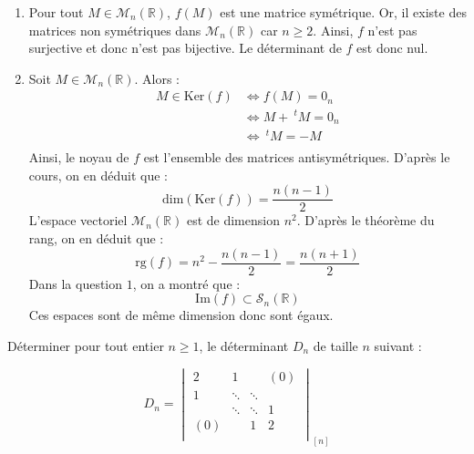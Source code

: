 \documentclass[a4paper,10pt]{report}
\begin{document}
\begin{enumerate}
\item Pour tout $M \in \mathcal{M}_n(\mathbb{R})$, $f(M)$ est une matrice symétrique. Or, il existe des matrices non symétriques dans $\mathcal{M}_n(\mathbb{R})$ car $n \geq 2$. Ainsi, $f$ n'est pas surjective et donc n'est pas bijective. Le déterminant de $f$ est donc nul.
\item Soit $M \in \mathcal{M}_n(\mathbb{R})$. Alors :
\begin{align*}
M \in \textrm{Ker}(f) & \Longleftrightarrow f(M)=0_n \\
& \Longleftrightarrow M+~^tM= 0_n \\
& \Longleftrightarrow ~^tM=-M \\
\end{align*}
Ainsi, le noyau de $f$ est l'ensemble des matrices antisymétriques. D'après le cours, on en déduit que :
$$ \textrm{dim}(\textrm{Ker}(f)) = \dfrac{n(n-1)}{2}$$
L'espace vectoriel $\mathcal{M}_n(\mathbb{R})$ est de dimension $n^2$. D'après le théorème du rang, on en déduit que :
$$ \textrm{rg}(f) = n^2 - \dfrac{n(n-1)}{2} = \dfrac{n(n+1)}{2}$$
Dans la question $1$, on a montré que :
$$ \textrm{Im}(f) \subset \mathcal{S}_n(\mathbb{R})$$
Ces espaces sont de même dimension donc sont égaux.
\end{enumerate}

\begin{Exa} Déterminer pour tout entier $n \geq 1$, le déterminant $D_n$ de taille $n$ suivant :

\[
    D_n =
    \begin{vmatrix}
        2 & 1 & {} & {(0)} \\
        1 & \ddots & \ddots & {} \\
        {} & \ddots & \ddots & 1 \\
        {(0)} & {} & 1 & 2 \\
    \end{vmatrix}_{[n]}
    \]
\end{Exa} 
\end{document}
